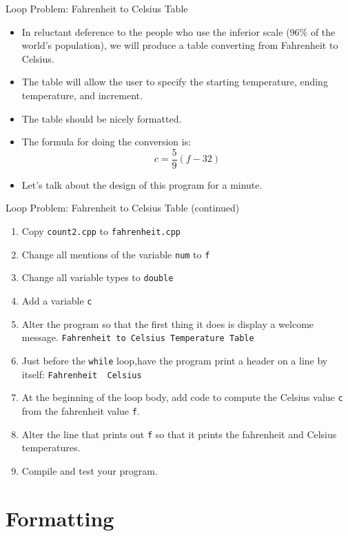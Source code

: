 \documentclass[xcolor=table]{beamer}
\begin{document}
\begin{frame}{Loop Problem: Fahrenheit to Celsius Table}
  \begin{itemize}[<+->]
    \item In reluctant deference to the people who use the inferior scale (96\% of the world's population), we will produce a table converting from Fahrenheit to Celsius.
    \item The table will allow the user to specify the starting temperature, ending temperature, and increment.
    \item The table should be nicely formatted.
    \item The formula for doing the conversion is:
    \[
      c = \displaystyle\frac{5}{9} (f - 32)
    \]
    \item Let's talk about the design of this program for a minute.
  \end{itemize}
\end{frame}

\begin{frame}[fragile]{Loop Problem: Fahrenheit to Celsius Table (continued)}
  \begin{enumerate}[<+->]
    \item Copy \texttt{count2.cpp} to \texttt{fahrenheit.cpp}
    \item Change all mentions of the variable \texttt{num} to \texttt{f}
    \item Change all variable types to \texttt{double}
    \item Add a variable \texttt{c}
    \item Alter the program so that the first thing it does is display a welcome message.
      \newline\texttt{Fahrenheit to Celsius Temperature Table}
    \item Just before the \texttt{while} loop,have the program print a header on a line by itself:
      \newline\verb#Fahrenheit  Celsius#
    \item At the beginning of the loop body, add code to compute the Celsius value \texttt{c} from the fahrenheit value \texttt{f}.
    \item Alter the line that prints out \texttt{f} so that it prints the fahrenheit and Celsius temperatures.
    \item Compile and test your program.
  \end{enumerate}
\end{frame}


\section{Formatting}
\end{document}
